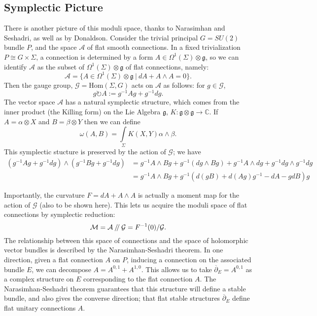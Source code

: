 \documentclass[]{article}
\newcommand{\Hom}{\text{Hom}}
\newcommand{\MM}{\mathcal{M}}
\newcommand{\dbar}{\overline{\partial}}
\newcommand{\cA}{\mathcal{A}}
\newcommand{\cG}{\mathcal{G}}
\newcommand{\sslash}{\mathbin{/\mkern-4mu/}}
\begin{document}
	\subsection{Symplectic Picture}
	There is another picture of this moduli space, thanks to Narasimhan and Seshadri, as well as by Donaldson. Consider the trivial principal $G=SU(2)$ bundle $P$, and the space $\cA$ of flat smooth connections. In a fixed trivialization $P \cong G\times \Sigma$, a connection is determined by a form $A \in \Omega^1(\Sigma)\otimes \mathfrak{g}$, so we can identify $\cA$ as the subset of $\Omega^1(\Sigma)\otimes\mathfrak{g}$ of flat connections, namely:
	\begin{equation}
		\cA = \{A \in \Omega^1(\Sigma)\otimes\mathfrak{g} ~|~ dA + A\wedge A = 0\}.
	\end{equation}
	Then the gauge group, $\cG = \Hom(\Sigma, G)$ acts on $\cA$ as follows: for $g\in \cG$,
	\begin{equation}
		g\circlearrowright A := g^{-1}Ag + g^{-1}dg.
	\end{equation}
	The vector space $\cA$ has a natural symplectic structure, which comes from the inner product (the Killing form) on the Lie Algebra $\mathfrak{g}$, $K:\mathfrak{g}\otimes\mathfrak{g}\to\mathbb{C}$. If $A = \alpha \otimes X$ and $B = \beta \otimes Y$ then we can define
	\begin{equation}
		\omega(A,B) = \int\limits_\Sigma K(X,Y)\alpha\wedge \beta.
	\end{equation}
	This symplectic stucture is preserved by the action of $\cG$; we have
	\begin{align*}
		(g^{-1} A g + g^{-1}dg) \wedge (g^{-1} B g + g^{-1}dg) &= g^{-1}A\wedge B g + g^{-1}(dg\wedge Bg) + g^{-1}A\wedge dg + g^{-1}dg \wedge g^{-1}dg \\
		&= g^{-1} A\wedge B g + g^{-1}(d(gB) + d(Ag)g^{-1} - dA - gdB)g
	\end{align*}
	
	Importantly, the curvature $F = dA + A\wedge A$ is actually a moment map for the action of $\cG$ (also to be shown here). This lets us acquire the moduli space of flat connections by symplectic reduction:
	\begin{equation}
		\MM = \cA\sslash\cG = F^{-1}(0)/ \cG.
	\end{equation} 
	The relationship between this space of connections and the space of holomorphic vector bundles is described by the Narasimhan-Seshadri theorem. In one direction, given a flat connection $A$ on $P$, inducing a connection on the associated bundle $E$, we can decompose $A = A^{0,1} + A^{1,0}$. This allows us to take $\dbar_E = A^{0,1}$ as a complex structure on $E$ corresponding to the flat connection $A$. The Narasimhan-Seshadri theorem guarantees that this structure will define a stable bundle, and also gives the converse direction; that flat stable structures $\dbar_E$ define flat unitary connections $A$. 
	
\end{document}
